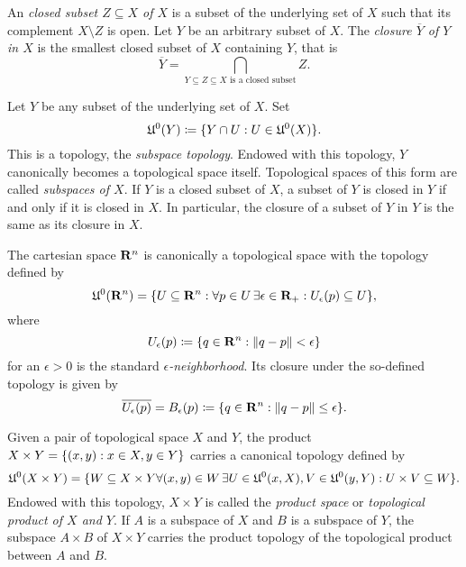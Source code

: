An \emph{closed subset $Z \subseteq X$ of $X$} is a subset of the underlying
set of $X$ such that its complement $X \setminus Z$ is open. Let $Y$ be an
arbitrary subset of $X$. The \emph{closure $\overline Y$ of $Y$ in $X$} is the
smallest closed subset of $X$ containing $Y$, that is
\begin{equation}
  \overline Y = \bigcap_{\text{$Y \subseteq Z \subseteq X$ is a closed subset}} Z.
\end{equation}

Let $Y$ be any subset of the underlying set of $X$. Set
\[
  \mathfrak U^0(Y) \coloneqq \lbrace Y \cap U: U \in \mathfrak U^0(X)\rbrace.
\]
This is a topology, the \emph{subspace topology}. Endowed with this topology,
$Y$ canonically becomes a topological space itself. Topological spaces of this form
are called \emph{subspaces of $X$}. If $Y$ is a closed subset of $X$, a subset of
$Y$ is closed in $Y$ if and only if it is closed in $X$. In particular, the closure
of a subset of $Y$ in $Y$ is the same as its closure in $X$.

The cartesian space $\mathbf{R}^n$ is canonically a topological space with the
topology defined by
\begin{equation}
  \label{eq:cartesian_topology}
  \mathfrak U^0(\mathbf{R}^n) = \lbrace U \subseteq \mathbf{R}^n : \forall p \in U \,
  \exists \epsilon \in \mathbf{R}_+: U_\epsilon(p) \subseteq U\rbrace,
\end{equation}
where
\[
  U_\epsilon(p) \coloneqq \lbrace q \in \mathbf{R}^n : \lVert q - p\rVert < \epsilon\rbrace
\]
for an $\epsilon > 0$ is the standard \emph{$\epsilon$-neighborhood}. Its 
closure under the so-defined topology is given by
\[
  \overline{U_\epsilon(p)} = B_\epsilon(p) \coloneqq
  \lbrace q \in \mathbf{R}^n : \lVert q - p\rVert \leq \epsilon\rbrace.
\]

Given a pair of topological space $X$ and $Y$, the product
$X \times Y = \lbrace(x, y) : x \in X, y \in Y\rbrace$ carries a canonical topology
defined by
\begin{equation}
  \label{eq:product_topology}
  \mathfrak U^0(X \times Y) = \lbrace W \subseteq X \times Y \forall (x, y) \in W \,
  \exists U \in \mathfrak U^0(x, X), V \in \mathfrak U^0(y, Y):
  U \times V \subseteq W\rbrace.
\end{equation}
Endowed with this topology, $X \times Y$ is called the \emph{product space} or
\emph{topological product of $X$ and $Y$}. If $A$ is a subspace of $X$ and
$B$ is a subspace of $Y$, the subspace $A \times B$ of $X \times Y$ carries the
product topology of the topological product between $A$ and $B$.

